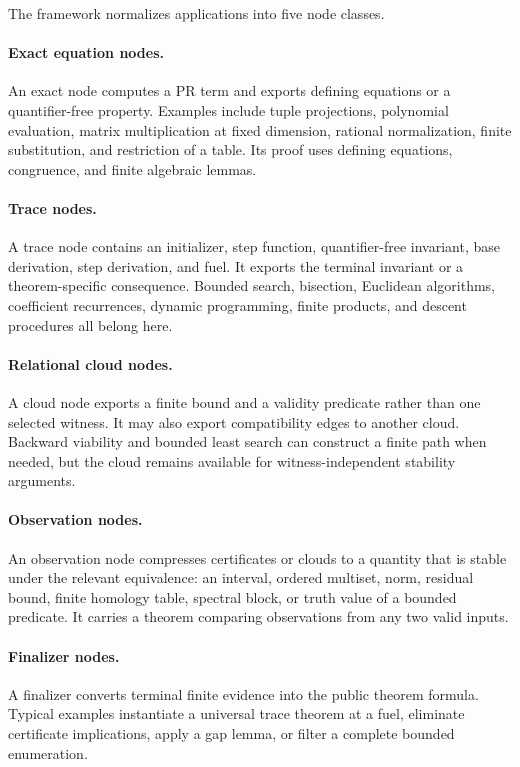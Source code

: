 The framework normalizes applications into five node classes.

\paragraph{Exact equation nodes.}
An exact node computes a PR term and exports defining equations or a
quantifier-free property.  Examples include tuple projections, polynomial
evaluation, matrix multiplication at fixed dimension, rational normalization,
finite substitution, and restriction of a table.  Its proof uses defining
equations, congruence, and finite algebraic lemmas.

\paragraph{Trace nodes.}
A trace node contains an initializer, step function, quantifier-free invariant,
base derivation, step derivation, and fuel.  It exports the terminal invariant
or a theorem-specific consequence.  Bounded search, bisection, Euclidean
algorithms, coefficient recurrences, dynamic programming, finite products,
and descent procedures all belong here.

\paragraph{Relational cloud nodes.}
A cloud node exports a finite bound and a validity predicate rather than one
selected witness.  It may also export compatibility edges to another cloud.
Backward viability and bounded least search can construct a finite path when
needed, but the cloud remains available for witness-independent stability
arguments.

\paragraph{Observation nodes.}
An observation node compresses certificates or clouds to a quantity that is
stable under the relevant equivalence: an interval, ordered multiset, norm,
residual bound, finite homology table, spectral block, or truth value of a
bounded predicate.  It carries a theorem comparing observations from any two
valid inputs.

\paragraph{Finalizer nodes.}
A finalizer converts terminal finite evidence into the public theorem formula.
Typical examples instantiate a universal trace theorem at a fuel, eliminate
certificate implications, apply a gap lemma, or filter a complete bounded
enumeration.

